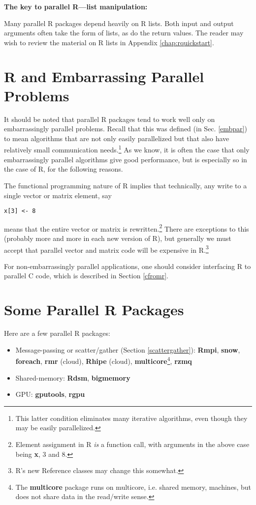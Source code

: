 {\bf The key to parallel R---list manipulation:}

Many parallel R packages depend heavily on R lists.  Both input and
output arguments often take the form of lists, as do the return values.
The reader may wish to review the material on R lists in Appendix
\ref{chap:rquickstart}. 

\section{R and Embarrassing Parallel Problems}

It should be noted that parallel R packages tend to work well only on
embarrassingly parallel problems.  Recall that this was defined (in Sec.
\ref{embpar}) to mean algorithms that are not only easily parallelized
but that also have relatively small communication needs.\footnote{This
latter condition eliminates many iterative algorithms, even though they
may be easily parallelized.}  As we know, it is often the case that only
embarrassingly parallel algorithms give good performance, but is
especially so in the case of R, for the following reasons.  

The functional programming nature of R implies that technically, any
write to a single vector or matrix element, say

\begin{lstlisting}
x[3] <- 8
\end{lstlisting}

means that the entire vector or matrix is rewritten.\footnote{Element
assignment in R {\it is} a function call, with arguments in the above
case being {\bf x}, 3 and 8.}  There are exceptions to this (probably
more and more in each new version of R), but generally we must accept
that parallel vector and matrix code will be expensive in
R.\footnote{R's new Reference classes may change this somewhat.}

For non-embarrassingly parallel applications, one should consider
interfacing R to parallel C code, which is described in Section
\ref{cfromr}.

\section{Some Parallel R Packages}

Here are a few parallel R packages:

\begin{itemize}

\item Message-passing or scatter/gather (Section \ref{scattergather}):
{\bf Rmpi}, {\bf snow}, {\bf foreach}, {\bf rmr} (cloud), {\bf Rhipe}
(cloud), {\bf multicore}\footnote{The {\bf multicore} package runs on
multicore, i.e. shared memory, machines, but does not share data in the
read/write sense.}, {\bf rzmq}

\item Shared-memory:  {\bf Rdsm}, {\bf bigmemory}

\item GPU: {\bf gputools}, {\bf rgpu}

\end{itemize}

